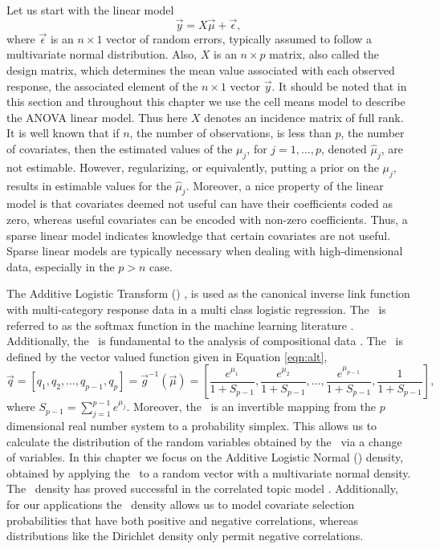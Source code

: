 Let us start with the linear model
\begin{equation}\label{def:linear_model}
\vec{y} = X\vec{\mu} + \vec{\epsilon},
\end{equation}
where $\vec{\epsilon}$ is an $n \times 1$ vector of random errors, typically assumed to follow a multivariate normal distribution. Also, $X$ is an $n \times p$ matrix, also called the design matrix, which determines the mean value associated with each observed response, the associated element of the $n\times 1$ vector $\vec{y}$. It should be noted that in this section and throughout this chapter we use the cell means model to describe the ANOVA linear model. Thus here $X$ denotes an incidence matrix of full rank. It is well known that if $n$, the number of observations, is less than $p$, the number of covariates, then the estimated values of the $\mu_j$, for $j=1,\dots,p$, denoted $\hat{\mu}_j$, are not estimable. However, regularizing, or equivalently, putting a prior on the $\mu_j$, results in estimable values for the $\hat{\mu}_j$. Moreover, a nice property of the linear model is that covariates deemed not useful can have their coefficients coded as zero, whereas useful covariates can be encoded with non-zero coefficients. Thus, a sparse linear model indicates knowledge that certain covariates are not useful. Sparse linear models are typically necessary when dealing with high-dimensional data, especially in the $p>n$ case. 

The Additive Logistic Transform (\ALT) , is used as the canonical inverse link function \cite{mccullagh1989generalized} with multi-category response data in a multi class logistic regression. The \ALT\ is referred to as the softmax function in the machine learning literature \cite{bishop2006pattern}. Additionally, the \ALT\ is fundamental to the analysis of compositional data \cite{aitchison1986statistical}. The \ALT\ is defined by the vector valued function given in Equation \ref{eqn:alt}, 
\begin{equation}\label{eqn:alt}
\vec{q} = \left[ q_1, q_2,\dots, q_{p-1}, q_p \right] =\vec{g}^{-1}(\vec{\mu})= \left[ \frac{e^{\mu_1}}{1+S_{p-1}},\frac{e^{\mu_2}}{1+S_{p-1}}, \dots,\frac{e^{\mu_{p-1}}}{1+S_{p-1}},\frac{1}{1+S_{p-1}} \right],\end{equation} 
where $S_{p-1}=\sum_{j=1}^{p-1}e^{\mu_j}$. Moreover, the \ALT\ is an invertible mapping from the $p$ dimensional real number system to a probability simplex. This allows us to calculate the distribution of the random variables obtained by the \ALT\ via a change of variables. In this chapter we focus on the Additive Logistic Normal (\ALN) density, obtained by applying the \ALT\ to a random vector with a multivariate normal density. The \ALN\ density has proved successful in the correlated topic model \cite{blei2007correlated,lafferty2005correlated}.  Additionally, for our applications the \ALN\ density allows us to model covariate selection probabilities that have both positive and negative correlations, whereas distributions like the Dirichlet density only permit negative correlations.

